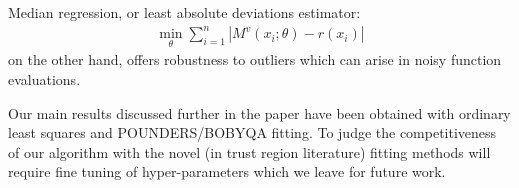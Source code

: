 Median regression, or least absolute deviations estimator:
\begin{align}
    \min\limits_{\theta}\sum\limits_{i=1}^{n}|M^v(x_i;\theta)-r(x_i)|
    \label{eq:fit-lad}
\end{align}
on the other hand, offers robustness to outliers which can arise in noisy function evaluations.

Our main results discussed further in the paper have been obtained with ordinary least squares and POUNDERS/BOBYQA fitting. To judge the competitiveness of our algorithm with the novel (in trust region literature) fitting methods will require fine tuning of hyper-parameters which we leave for future work.
